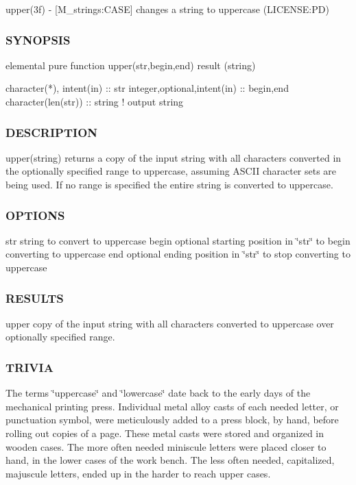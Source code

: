 upper(3f) -\/ \mbox{[}M\+\_\+strings\+:C\+A\+SE\mbox{]} changes a string to uppercase (L\+I\+C\+E\+N\+SE\+:PD) 

\subsubsection*{S\+Y\+N\+O\+P\+S\+IS}

\begin{DoxyVerb}elemental pure function upper(str,begin,end) result (string)

 character(*), intent(in)    :: str
 integer,optional,intent(in) :: begin,end
 character(len(str))         :: string  ! output string
\end{DoxyVerb}
 \subsubsection*{D\+E\+S\+C\+R\+I\+P\+T\+I\+ON}

upper(string) returns a copy of the input string with all characters converted in the optionally specified range to uppercase, assuming A\+S\+C\+II character sets are being used. If no range is specified the entire string is converted to uppercase.

\subsubsection*{O\+P\+T\+I\+O\+NS}

str string to convert to uppercase begin optional starting position in \char`\"{}str\char`\"{} to begin converting to uppercase end optional ending position in \char`\"{}str\char`\"{} to stop converting to uppercase

\subsubsection*{R\+E\+S\+U\+L\+TS}

upper copy of the input string with all characters converted to uppercase over optionally specified range.

\subsubsection*{T\+R\+I\+V\+IA}

The terms \char`\"{}uppercase\char`\"{} and \char`\"{}lowercase\char`\"{} date back to the early days of the mechanical printing press. Individual metal alloy casts of each needed letter, or punctuation symbol, were meticulously added to a press block, by hand, before rolling out copies of a page. These metal casts were stored and organized in wooden cases. The more often needed miniscule letters were placed closer to hand, in the lower cases of the work bench. The less often needed, capitalized, majuscule letters, ended up in the harder to reach upper cases.

